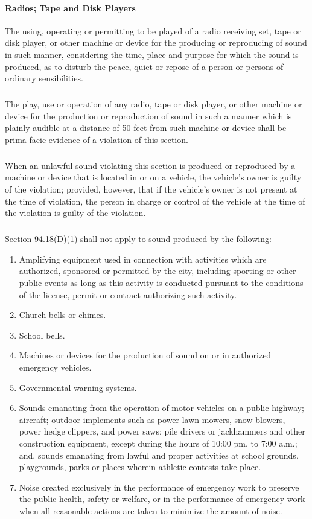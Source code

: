 \paragraph{Radios; Tape and Disk Players} The using, operating or permitting to be played of a radio receiving set, tape or disk player, or other machine or device for the producing or reproducing of sound in such manner, considering the time, place and purpose for which the sound is produced, as to disturb the peace, quiet or repose of a person or persons of ordinary sensibilities.
\subparagraph{}
The play, use or operation of any radio, tape or disk player, or other machine or device for the production or reproduction of sound in such a manner which is plainly audible at a distance of 50 feet from such machine or device shall be prima facie evidence of a violation of this section.
\subparagraph{}
When an unlawful sound violating this section is produced or reproduced by a machine or device that is located in or on a vehicle, the vehicle’s owner is guilty of the violation; provided, however, that if the vehicle’s owner is not present at the time of violation, the person in charge or control of the vehicle at the time of the violation is guilty of the violation.
\subparagraph{}
Section 94.18(D)(1) shall not apply to sound produced by the following:
\begin{enumerate}[{\indent}A.]
    \item Amplifying equipment used in connection with activities which are authorized, sponsored or permitted by the city, including sporting or other public events as long as this activity is conducted pursuant to the conditions of the license, permit or contract authorizing such activity.
    \item Church bells or chimes.
    \item School bells.
    \item Machines or devices for the production of sound on or in authorized emergency vehicles.
    \item Governmental warning systems.
    \item Sounds emanating from the operation of motor vehicles on a public highway; aircraft; outdoor implements such as power lawn mowers, snow blowers, power hedge clippers, and power saws; pile drivers or jackhammers and other construction equipment, except during the hours of 10:00 pm. to 7:00 a.m.; and, sounds emanating from lawful and proper activities at school grounds, playgrounds, parks or places wherein athletic contests take place.
    \item Noise created exclusively in the performance of emergency work to preserve the public health, safety or welfare, or in the performance of emergency work when all reasonable actions are taken to minimize the amount of noise.
\end{enumerate}
